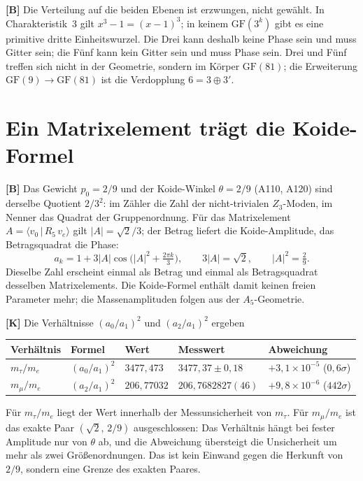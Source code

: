 \textbf{[B]} Die Verteilung auf die beiden Ebenen ist erzwungen, nicht gewählt.
In Charakteristik~3 gilt $x^3-1=(x-1)^3$; in keinem $\mathrm{GF}(3^k)$ gibt es
eine primitive dritte Einheitswurzel. Die Drei kann deshalb keine Phase sein
und muss Gitter sein; die Fünf kann kein Gitter sein und muss Phase sein.
Drei und Fünf treffen sich nicht in der Geometrie, sondern im Körper
$\mathrm{GF}(81)$; die Erweiterung $\mathrm{GF}(9)\to\mathrm{GF}(81)$ ist die
Verdopplung $6=3\oplus3'$.

\section{Ein Matrixelement trägt die Koide-Formel}

\textbf{[B]} Das Gewicht $p_0=2/9$ und der Koide-Winkel $\theta=2/9$ (A110,
A120) sind derselbe Quotient $2/3^2$: im Zähler die Zahl der nicht-trivialen
$Z_3$-Moden, im Nenner das Quadrat der Gruppenordnung. Für das Matrixelement
$A=\langle v_0\,|\,R_5\,v_e\rangle$ gilt $|A|=\sqrt2/3$; der Betrag liefert
die Koide-Amplitude, das Betragsquadrat die Phase:
\[
  a_k = 1 + 3|A|\cos\bigl(|A|^2 + \tfrac{2\pi k}{3}\bigr),\qquad
  3|A| = \sqrt2,\qquad |A|^2 = \tfrac29 .
\]
Dieselbe Zahl erscheint einmal als Betrag und einmal als Betragsquadrat
desselben Matrixelements. Die Koide-Formel enthält damit keinen freien
Parameter mehr; die Massenamplituden folgen aus der $A_5$-Geometrie.

\textbf{[K]} Die Verhältnisse $(a_0/a_1)^2$ und $(a_2/a_1)^2$ ergeben
\begin{center}
\small
\begin{tabular}{@{}lllll@{}}
\toprule
Verhältnis & Formel & Wert & Messwert & Abweichung \\
\midrule
$m_\tau/m_e$ & $(a_0/a_1)^2$ & $3477{,}473$ & $3477{,}37\pm0{,}18$ & $+3{,}1\times10^{-5}$ ($0{,}6\sigma$) \\
$m_\mu/m_e$ & $(a_2/a_1)^2$ & $206{,}77032$ & $206{,}7682827(46)$ & $+9{,}8\times10^{-6}$ ($442\sigma$) \\
\bottomrule
\end{tabular}
\end{center}
Für $m_\tau/m_e$ liegt der Wert innerhalb der Messunsicherheit von $m_\tau$.
Für $m_\mu/m_e$ ist das exakte Paar $(\sqrt2,\,2/9)$ ausgeschlossen: Das
Verhältnis hängt bei fester Amplitude nur von $\theta$ ab, und die
Abweichung übersteigt die Unsicherheit um mehr als zwei Größenordnungen.
Das ist kein Einwand gegen die Herkunft von
$2/9$, sondern eine Grenze des exakten Paares.

